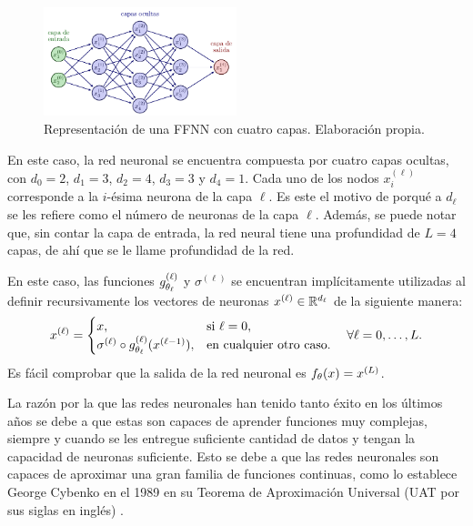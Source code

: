 {{\begin{example}
        \begin{figure}[htbp]
            \centering
            \includegraphics[width=0.5\textwidth]{img/neural_network/neural_network_feed_forward.pdf}
            \caption{Representación de una FFNN con cuatro capas. Elaboración propia.}
            \label{fig:ejemplo-red-neuronal}
        \end{figure}

        En este caso, la red neuronal se encuentra compuesta por cuatro capas ocultas, con $d_0 = 2$, $d_1 = 3$, $d_2 = 4$, $d_3 = 3$ y $d_4 = 1$. Cada uno de los nodos $x_i^{(\ell)}$ corresponde a la $i$-ésima neurona de la capa $\ell$. Es este el motivo de porqué a $d_\ell$ se les refiere como el número de neuronas de la capa $\ell$. Además, se puede notar que, sin contar la capa de entrada, la red neural tiene una profundidad de $L = 4$ capas, de ahí que se le llame profundidad de la red.

        En este caso, las funciones $g^{(\ell)}_{{\theta}_\ell}$ y $\sigma^{(\ell)}$ se encuentran implícitamente utilizadas al definir recursivamente los vectores de neuronas $x^{(\ell)} \in \mathbb{R}^{d_\ell}$ de la siguiente manera:
        \begin{equation}
            x^{(\ell)} =
            \begin{cases}
                {x},                                                         & \text{si } \ell = 0,           \\
                \sigma^{(\ell)} \circ g^{(\ell)}_{{\theta}_\ell} (x^{(\ell-1)}), & \text{en cualquier otro caso.}
            \end{cases}
            \quad \forall \ell = 0, \ldots, L.
        \end{equation}
        Es fácil comprobar que la salida de la red neuronal es $f_{{\theta}}({x}) = x^{(L)}$.
    \end{example}

    La razón por la que las redes neuronales han tenido tanto éxito en los últimos años se debe a que estas son capaces de aprender funciones muy complejas, siempre y cuando se les entregue suficiente cantidad de datos y tengan la capacidad de neuronas suficiente. Esto se debe a que las redes neuronales son capaces de aproximar una gran familia de funciones continuas, como lo establece George Cybenko en el 1989 en su Teorema de Aproximación Universal (UAT por sus siglas en inglés) \cite{cybenko1989approximation}.

}}
